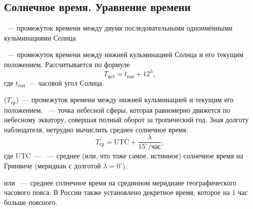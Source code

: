 \subsection{Солнечное время. Уравнение времени}
~--- промежуток времени между двумя последовательными одноимёнными кульминациями Солнца.

~--- промежуток времени между нижней кульминацией Солнца и его текущим положением. Рассчитывается по формуле
\begin{equation}
	T_{\text{ист}} = t_{\text{сол}}+12^h,
\end{equation}
где $t_{\text{сол}}$~--- часовой угол Солнца.

 ($T_\text{ср}$)~--- промежуток времени между нижней кульминацией  и текущим его положением. ~--- точка небесной сферы, которая равномерно движется по небесному экватору, совершая полный оборот за тропический год. Зная долготу наблюдателя, нетрудно вычислить среднее солнечное время:
\begin{equation*}
	T_\text{ср} = \text{UTC} + \frac{\lambda}{15^\circ/\text{час}},
\end{equation*}
где UTC~--- ~--- среднее (или, что тоже самое, истинное) солнечное время на Гринвиче (меридиан с долготой $\lambda = 0^\circ$).

 или ~--- среднее солнечное время на срединном меридиане географического часового пояса. В России также установлено декретное время, которое на 1 час больше поясного.

